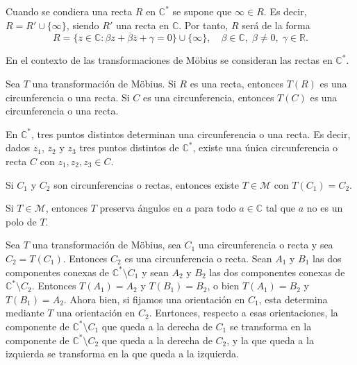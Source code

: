 \begin{remark}
    Cuando se condiera una recta $R$ en $\mathbb{C}^\ast$ se supone que $\infty \in R$.
    Es decir, $R = R' \cup \{\infty\}$, siendo $R'$ una recta en $\mathbb{C}$.
    Por tanto, $R$ será de la forma
    $$R = \{z \in \mathbb{C} : \beta z + \overline{\beta}\overline{z} + \gamma = 0\} \cup \{\infty\}, \quad \beta \in \mathbb{C}, \; \beta \neq 0, \; \gamma \in \mathbb{R}.$$
\end{remark}

En el contexto de las transformaciones de Möbius se consideran las rectas en $\mathbb{C}^\ast$.

\begin{proposition}
    Sea $T$ una transformación de Möbius.
    Si $R$ es una recta, entonces $T(R)$ es una circunferencia o una recta.
    Si $C$ es una circunferencia, entonces $T(C)$ es una circunferencia o una recta.
\end{proposition}

\begin{remark}
    En $\mathbb{C}^\ast$, tres puntos distintos determinan una circunferencia o una recta.
    Es decir, dados $z_1$, $z_2$ y $z_3$ tres puntos distintos de $\mathbb{C}^\ast$, existe una única circunferencia o recta $C$ con $z_1, z_2, z_3 \in C$.
\end{remark}

\begin{remark}
    Si $C_1$ y $C_2$ son circunferencias o rectas, entonces existe $T \in \mathcal{M}$ con $T(C_1) = C_2$.
\end{remark}

\begin{remark}
    Si $T \in \mathcal{M}$, entonces $T$ preserva ángulos en $a$ para todo $a \in \mathbb{C}$ tal que $a$ no es un polo de $T$.
\end{remark}

Sea $T$ una transformación de Möbius, sea $C_1$ una circunferencia o recta y sea $C_2 = T(C_1)$.
Entonces $C_2$ es una circunferencia o recta.
Sean $A_1$ y $B_1$ las dos componentes conexas de $\mathbb{C}^\ast \setminus C_1$ y sean $A_2$ y $B_2$ las dos componentes conexas de $\mathbb{C}^\ast \setminus C_2$.
Entonces $T(A_1) = A_2$ y $T(B_1) = B_2$, o bien $T(A_1) = B_2$ y $T(B_1) = A_2$.
Ahora bien, si fijamos una orientación en $C_1$, esta determina mediante $T$ una orientación en $C_2$.
Enrtonces, respecto a esas orientaciones, la componente de $\mathbb{C}^\ast \setminus C_1$ que queda a la derecha de $C_1$ se transforma en la componente de $\mathbb{C}^\ast \setminus C_2$ que queda a la derecha de $C_2$, y la que queda a la izquierda se transforma en la que queda a la izquierda.

